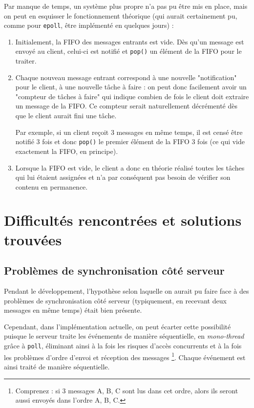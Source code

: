 \documentclass{article}
\begin{document}
\noindent Par manque de temps, un système plus propre n'a pas pu être mis en place, mais on peut en esquisser le fonctionnement théorique (qui aurait certainement pu, comme pour \texttt{epoll}, être implémenté en quelques jours) :
\begin{enumerate}
    \item Initialement, la FIFO des messages entrants est vide. Dès qu'un message est envoyé au client, celui-ci est notifié et \texttt{pop()} un élément de la FIFO pour le traiter.
    \item Chaque nouveau message entrant correspond à une nouvelle "notification" pour le client, à une nouvelle tâche à faire : on peut donc facilement avoir un "compteur de tâches à faire" qui indique combien de fois le client doit extraire un message de la FIFO. Ce compteur serait naturellement décrémenté dès que le client aurait fini une tâche.

    Par exemple, si un client reçoit 3 messages en même temps, il est censé être notifié 3 fois et donc \texttt{pop()} le premier élément de la FIFO 3 fois (ce qui vide exactement la FIFO, en principe).
    \item Lorsque la FIFO est vide, le client a donc en théorie réalisé toutes les tâches qui lui étaient assignées et n'a par conséquent pas besoin de vérifier son contenu en permanence.
\end{enumerate}

\section{Difficultés rencontrées et solutions trouvées}
\subsection{Problèmes de synchronisation côté serveur}
Pendant le développement, l'hypothèse selon laquelle on aurait pu faire face à des problèmes de synchronisation côté serveur (typiquement, en recevant deux messages en même temps) était bien présente.

Cependant, dans l'implémentation actuelle, on peut écarter cette possibilité puisque le serveur traite les événements de manière séquentielle, en \textit{mono-thread} grâce à \texttt{poll}, éliminant ainsi à la fois les risques d'accès concurrents et à la fois les problèmes d'ordre d'envoi et réception des messages \footnote{Comprenez : si 3 messages A, B, C sont lus dans cet ordre, alors ils seront aussi envoyés dans l'ordre A, B, C.}. Chaque événement est ainsi traité de manière séquentielle.
\end{document}

